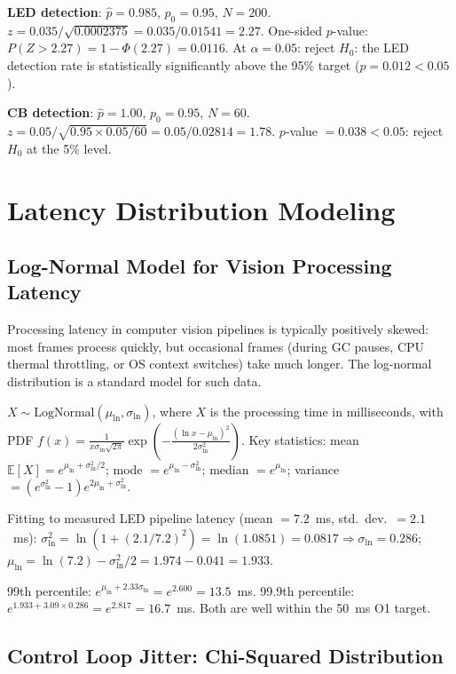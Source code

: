 \begin{eqblock}
\textbf{LED detection}: $\hat p=0.985$, $p_0=0.95$, $N=200$. $z = 0.035/\sqrt{0.0002375} = 0.035/0.01541 = 2.27$. One-sided $p$-value: $P(Z>2.27) = 1-\Phi(2.27) = 0.0116$. At $\alpha=0.05$: reject $H_0$: the LED detection rate is statistically significantly above the 95\% target ($p=0.012<0.05$).

\textbf{CB detection}: $\hat p=1.00$, $p_0=0.95$, $N=60$. $z = 0.05/\sqrt{0.95\times0.05/60} = 0.05/0.02814 = 1.78$. $p$-value $=0.038<0.05$: reject $H_0$ at the 5\% level.
\end{eqblock}

\section{Latency Distribution Modeling}

\subsection{Log-Normal Model for Vision Processing Latency}

Processing latency in computer vision pipelines is typically positively skewed: most frames process quickly, but occasional frames (during GC pauses, CPU thermal throttling, or OS context switches) take much longer. The log-normal distribution is a standard model for such data.

\begin{eqblock}
$X\sim\text{LogNormal}(\mu_{\ln},\sigma_{\ln})$, where $X$ is the processing time in milliseconds, with PDF $f(x) = \frac{1}{x\sigma_{\ln}\sqrt{2\pi}}\exp\!\left(-\frac{(\ln x-\mu_{\ln})^2}{2\sigma_{\ln}^2}\right)$. Key statistics: mean $\mathbb{E}[X]=e^{\mu_{\ln}+\sigma_{\ln}^2/2}$; mode $=e^{\mu_{\ln}-\sigma_{\ln}^2}$; median $=e^{\mu_{\ln}}$; variance $=(e^{\sigma_{\ln}^2}-1)e^{2\mu_{\ln}+\sigma_{\ln}^2}$.

Fitting to measured LED pipeline latency (mean $=7.2$~ms, std.\ dev.\ $=2.1$~ms): $\sigma_{\ln}^2 = \ln(1+(2.1/7.2)^2) = \ln(1.0851) = 0.0817 \Rightarrow \sigma_{\ln}=0.286$; $\mu_{\ln} = \ln(7.2)-\sigma_{\ln}^2/2 = 1.974-0.041 = 1.933$.

99th percentile: $e^{\mu_{\ln}+2.33\sigma_{\ln}} = e^{2.600} = 13.5$~ms. 99.9th percentile: $e^{1.933+3.09\times0.286} = e^{2.817} = 16.7$~ms. Both are well within the 50~ms O1 target.
\end{eqblock}

\subsection{Control Loop Jitter: Chi-Squared Distribution}

